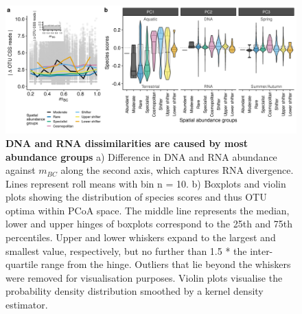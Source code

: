 \documentclass[12pt,a4paper]{article} %
\begin{document}
\begin{figure}[!ht]
\centering
\includegraphics[width=15cm]{../../Figures/Final/abgroups_rollmean_violin}
\caption{\textbf{DNA and RNA dissimilarities are caused by most abundance groups} a) Difference in DNA and RNA abundance against $m_{BC}$ along the second axis, which captures RNA divergence. Lines represent roll means with bin n = 10. b) Boxplots and violin plots showing the distribution of species scores and thus OTU optima within PCoA space. The middle line represents the median, lower and upper hinges of boxplots correspond to the 25th and 75th percentiles. Upper and lower whiskers expand to the largest and smallest value, respectively, but no further than 1.5 * the inter-quartile range from the hinge. Outliers that lie beyond the whiskers were removed for visualisation purposes. Violin plots visualise the probability density distribution smoothed by a kernel density estimator.}
\end{figure}
\end{document}
